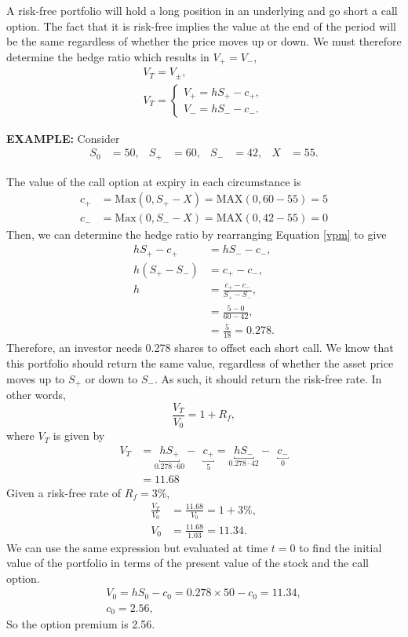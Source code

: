 \documentclass[../notes_compiled.tex]{subfiles}
\begin{document}
\begin{itemize}
\item A risk-free portfolio will hold a long position in an underlying and go short a call option. The fact that it is risk-free implies the value at the end of the period will be the same regardless of whether the price moves up or down. We must therefore determine the hedge ratio which results in $V_{+} = V_{-}$,
\begin{gather}
V_{T} = V_{\pm}, \\
V_{T} = \begin{cases}V_{+}=hS_{+} - c_{+}, \\ V_{-}=hS_{-}-c_{-}.\end{cases} \label{vpm}
\end{gather}
{\color{RedViolet}
\item[] \textbf{EXAMPLE:} Consider
\begin{align*}
S_{0}&=50, & S_{+}&=60, & S_{-}&=42, & X&=55.
\end{align*}
}
{\color{RoyalBlue}
The value of the call option at expiry in each circumstance is
\begin{align*}
c_{+}&=\text{Max}(0,S_{+}-X)=\text{MAX}(0, 60-55)=5 \\
c_{-}&=\text{Max}(0,S_{-}-X)=\text{MAX}(0, 42-55)=0
\end{align*}
Then, we can determine the hedge ratio by rearranging Equation \ref{vpm} to give
\begin{align*}
hS_{+} - c_{+} &=hS_{-}-c_{-}, \\
h(S_{+} - S_{-})&=c_{+} - c_{-}, \\
h&=\frac{c_{+}-c_{-}}{S_{+}-S_{-}}, \\
&=\frac{5-0}{60-42}, \\
&= \frac{5}{18} = 0.278.
\end{align*}
Therefore, an investor needs 0.278 shares to offset each short call. We know that this portfolio should return the same value, regardless of whether the asset price moves up to $S_{+}$ or down to $S_{-}$. As such, it should return the risk-free rate. In other words,
\begin{equation*}
\frac{V_{T}}{V_{0}}=1+R_{f},
\end{equation*}
where $V_{T}$ is given by 
\begin{align*}
V_{T} &=\underbracket{hS_{+}}_{0.278\cdot60}-\phantom{,}\underbracket{c_{+}}_{5} = \underbracket{hS_{-}}_{0.278\cdot42}-\phantom{,}\underbracket{c_{-}}_{0} \\
&=11.68
\end{align*}
Given a risk-free rate of $R_{f}=3\%$, 
\begin{align*}
\frac{V_{T}}{V_{0}} &= \frac{11.68}{V_{0}} = 1+3\%, \\
V_{0}&=\frac{11.68}{1.03}=11.34.
\end{align*}
We can use the same expression but evaluated at time $t=0$ to find the initial value of the portfolio in terms of the present value of the stock and the call option.
\begin{gather*}
V_{0}=hS_{0}-c_{0} = 0.278\times50 - c_{0} = 11.34, \\
c_{0}=2.56,
\end{gather*}
So the option premium is 2.56.
}


\end{itemize}
\end{document}
